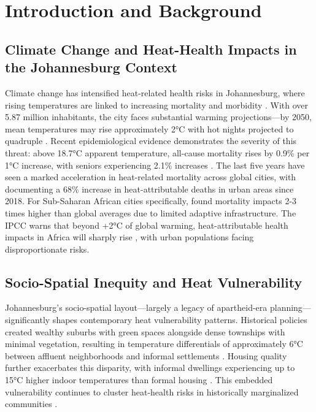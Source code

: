 \section{Introduction and Background}

\subsection{Climate Change and Heat-Health Impacts in the Johannesburg Context}

Climate change has intensified heat-related health risks in Johannesburg, where rising temperatures are linked to increasing mortality and morbidity \citep{Gasparrini2015, Romanello2023}. With over 5.87 million inhabitants, the city faces substantial warming projections—by 2050, mean temperatures may rise approximately 2°C with hot nights projected to quadruple \citep{Engelbrecht2015, WorldBank2024}. Recent epidemiological evidence demonstrates the severity of this threat: above 18.7°C apparent temperature, all-cause mortality rises by 0.9\% per 1°C increase, with seniors experiencing 2.1\% increases \citep{Wichmann2017}. The last five years have seen a marked acceleration in heat-related mortality across global cities, with \citet{Armstrong2023} documenting a 68\% increase in heat-attributable deaths in urban areas since 2018. For Sub-Saharan African cities specifically, \citet{Gasparrini2022} found mortality impacts 2-3 times higher than global averages due to limited adaptive infrastructure. The IPCC warns that beyond +2°C of global warming, heat-attributable health impacts in Africa will sharply rise \citep{IPCC2024}, with urban populations facing disproportionate risks.

\subsection{Socio-Spatial Inequity and Heat Vulnerability}

Johannesburg's socio-spatial layout—largely a legacy of apartheid-era planning—significantly shapes contemporary heat vulnerability patterns. Historical policies created wealthy suburbs with green spaces alongside dense townships with minimal vegetation, resulting in temperature differentials of approximately 6°C between affluent neighborhoods and informal settlements \citep{WorldBank2024}. Housing quality further exacerbates this disparity, with informal dwellings experiencing up to 15°C higher indoor temperatures than formal housing \citep{Naicker2017}. This embedded vulnerability continues to cluster heat-health risks in historically marginalized communities \citep{Strauss2019}.


